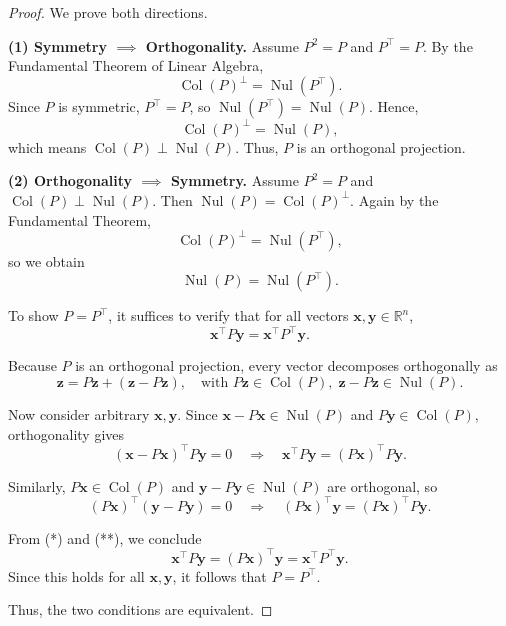 \begin{proof}
We prove both directions.

\medskip
\noindent\textbf{(1) Symmetry \( \implies \) Orthogonality.}  
Assume \( P^2 = P \) and \( P^\top = P \).  
By the Fundamental Theorem of Linear Algebra,
\[
\operatorname{Col}(P)^\perp = \operatorname{Nul}(P^\top).
\]
Since \( P \) is symmetric, \( P^\top = P \), so \( \operatorname{Nul}(P^\top) = \operatorname{Nul}(P) \). Hence,
\[
\operatorname{Col}(P)^\perp = \operatorname{Nul}(P),
\]
which means \( \operatorname{Col}(P) \perp \operatorname{Nul}(P) \). Thus, \( P \) is an orthogonal projection.

\medskip
\noindent\textbf{(2) Orthogonality \( \implies \) Symmetry.}  
Assume \( P^2 = P \) and \( \operatorname{Col}(P) \perp \operatorname{Nul}(P) \).  
Then \( \operatorname{Nul}(P) = \operatorname{Col}(P)^\perp \). Again by the Fundamental Theorem,
\[
\operatorname{Col}(P)^\perp = \operatorname{Nul}(P^\top),
\]
so we obtain
\[
\operatorname{Nul}(P) = \operatorname{Nul}(P^\top).
\]

To show \( P = P^\top \), it suffices to verify that for all vectors \( \mathbf{x}, \mathbf{y} \in \mathbb{R}^n \),
\[
\mathbf{x}^\top P \mathbf{y} = \mathbf{x}^\top P^\top \mathbf{y}.
\]

Because \( P \) is an orthogonal projection, every vector decomposes orthogonally as
\[
\mathbf{z} = P\mathbf{z} + (\mathbf{z} - P\mathbf{z}), \quad \text{with } P\mathbf{z} \in \operatorname{Col}(P),\; \mathbf{z} - P\mathbf{z} \in \operatorname{Nul}(P).
\]

Now consider arbitrary \( \mathbf{x}, \mathbf{y} \). Since \( \mathbf{x} - P\mathbf{x} \in \operatorname{Nul}(P) \) and \( P\mathbf{y} \in \operatorname{Col}(P) \), orthogonality gives
\[
(\mathbf{x} - P\mathbf{x})^\top P\mathbf{y} = 0
\quad\Longrightarrow\quad
\mathbf{x}^\top P\mathbf{y} = (P\mathbf{x})^\top P\mathbf{y}. \tag{*}
\]

Similarly, \( P\mathbf{x} \in \operatorname{Col}(P) \) and \( \mathbf{y} - P\mathbf{y} \in \operatorname{Nul}(P) \) are orthogonal, so
\[
(P\mathbf{x})^\top (\mathbf{y} - P\mathbf{y}) = 0
\quad\Longrightarrow\quad
(P\mathbf{x})^\top \mathbf{y} = (P\mathbf{x})^\top P\mathbf{y}. \tag{**}
\]

From (*) and (**), we conclude
\[
\mathbf{x}^\top P\mathbf{y} = (P\mathbf{x})^\top \mathbf{y} = \mathbf{x}^\top P^\top \mathbf{y}.
\]
Since this holds for all \( \mathbf{x}, \mathbf{y} \), it follows that \( P = P^\top \).

\medskip
Thus, the two conditions are equivalent.
\end{proof}






